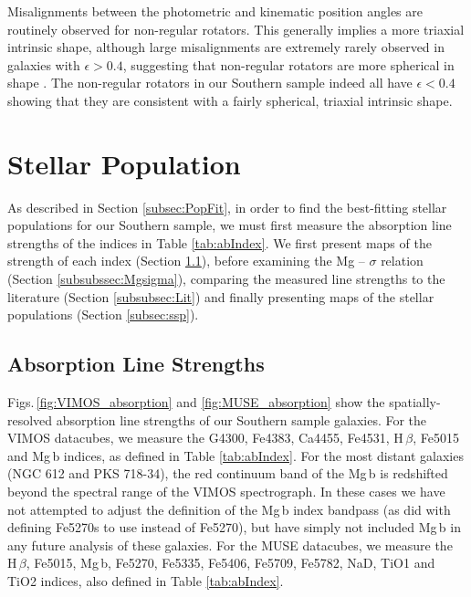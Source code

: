 			Misalignments between the photometric and kinematic position angles are routinely observed for non-regular rotators. This generally implies a more triaxial intrinsic shape, although large misalignments are extremely rarely observed in galaxies with $\epsilon > 0.4$, suggesting that non-regular rotators are more spherical in shape \citep{Cappellari2016}. The non-regular rotators in our Southern sample indeed all have $\epsilon < 0.4$ showing that they are consistent with a fairly spherical, triaxial intrinsic shape.


\section{Stellar Population}
	\label{sec:pop}
	As described in Section \ref{subsec:PopFit}, in order to find the best-fitting stellar populations for our Southern sample, we must first measure the absorption line strengths of the indices in Table \ref{tab:abIndex}. We first present maps of the strength of each index (Section \ref{subsec:absorption}), before examining the Mg -- $\sigma$ relation (Section \ref{subsubssec:Mgsigma}), comparing the measured line strengths to the literature (Section \ref{subsubsec:Lit}) and finally presenting maps of the stellar populations (Section \ref{subsec:ssp}).

	\subsection{Absorption Line Strengths}
		\label{subsec:absorption}

		Figs.\,\ref{fig:VIMOS_absorption} and \ref{fig:MUSE_absorption} show the spatially-resolved absorption line strengths of our Southern sample galaxies. For the VIMOS datacubes, we measure the G4300, Fe4383, Ca4455, Fe4531, H\,$\beta$, Fe5015 and Mg\,b indices, as defined in Table \ref{tab:abIndex}. For the most distant galaxies (NGC 612 and PKS 718-34), the red continuum band of the Mg\,b is redshifted beyond the spectral range of the VIMOS spectrograph. In these cases we have not attempted to adjust the definition of the Mg\,b index bandpass (as \citealt{Kuntschner2006} did with defining Fe5270s to use instead of Fe5270), but have simply not included Mg\,b in any future analysis of these galaxies. For the MUSE datacubes, we measure the H\,$\beta$, Fe5015, Mg\,b, Fe5270, Fe5335, Fe5406, Fe5709, Fe5782, NaD, TiO1 and TiO2 indices, also defined in Table \ref{tab:abIndex}.

